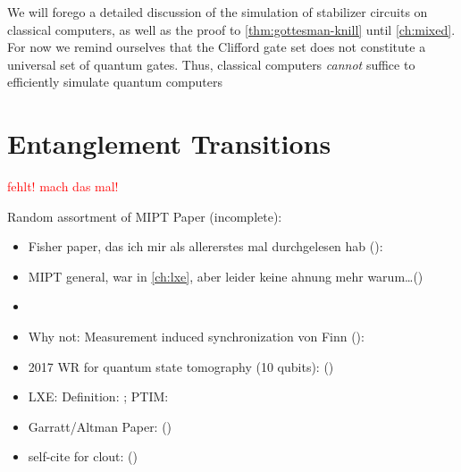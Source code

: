 We will forego a detailed discussion of the simulation of stabilizer circuits
on classical computers, as well as the proof to \cref{thm:gottesman-knill}
until \cref{ch:mixed}. For now we remind ourselves that the Clifford gate set
does not constitute a universal set of quantum gates. Thus, classical computers
\emph{cannot} suffice to efficiently simulate quantum computers
\clearpage
\section{Entanglement Transitions}\label{sec:ent-trans}

\textcolor{red}{fehlt! mach das mal!}

Random assortment of MIPT Paper (incomplete):

\begin{itemize}
  \item Fisher paper, das ich mir als allererstes mal durchgelesen hab
    ():
    \cite{liMeasurementdrivenEntanglementTransition2019}
  \item MIPT general, war in \cref{ch:lxe}, aber leider keine ahnung mehr
    warum\ldots () \cite{baoTheoryPhaseTransition2020}
  \item {}
    \cite{baoSymmetryEnrichedPhases2021}
  \item Why not: Measurement induced synchronization von Finn
    ():
    \cite{schmolkeMeasurementinducedQuantumSynchronization2023}
  \item 2017 WR for quantum state tomography (10 qubits):
    ()
    \cite{song10QubitEntanglementParallel2017}
  \item LXE: Definition: \cite{liCrossEntropyBenchmark2023}; PTIM:
    \cite{tikhanovskayaUniversalityCrossEntropy2023}
  \item Garratt/Altman Paper:
    () \cite{garrattProbingPostmeasurementEntanglement2023}
  \item self-cite for clout:
    ()
    \cite{schmolkeBoostingInformationTransfer2024}
\end{itemize}

